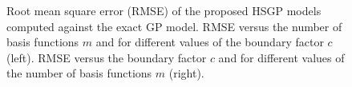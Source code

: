 \documentclass[onecolumn,a4paper,11pt]{article}
\begin{document}
\begin{figure}
\centering
{}
\caption{Root mean square error (RMSE) of the proposed HSGP models computed against the exact GP model. RMSE versus the number of basis functions $m$ and for different values of the boundary factor $c$ (left). RMSE versus the boundary factor $c$ and for different values of the number of basis functions $m$ (right). }
  \label{fig4_MSE_vs_J}
\end{figure}
\end{document}
